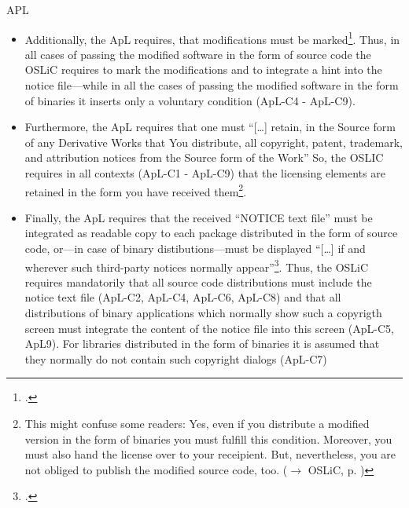 \begin{license}{APL}
\begin{itemize}
  \item Additionally, the ApL requires, that modifications must be
  marked\footcite[cf.][\nopage wp.\ §4.2]{Apl20OsiLicense2004a}. Thus, in all
  cases of passing the modified software in the form of source code the OSLiC
  requires to mark the modifications and to integrate a hint into the notice
  file---while in all the cases of passing the modified software in the form of
  binaries it inserts only a voluntary condition (ApL-C4 - ApL-C9).
  
  \item Furthermore, the ApL requires that one must \enquote{[\ldots] retain, in
  the Source form of any Derivative Works that You distribute, all copyright,
  patent, trademark, and attribution notices from the Source form of the Work}
  So, the OSLIC requires in all contexts (ApL-C1 - ApL-C9) that the licensing
  elements are retained in the form you have received them\footnote{This might
  confuse some readers: Yes, even if you distribute a modified version in the
  form of binaries you must fulfill this condition. Moreover, you must also hand
  the license over to your receipient. But, nevertheless, you are not obliged to
  publish the modified source code, too. ($\rightarrow$ OSLiC, p.
  )}.
  
  \item Finally, the ApL requires that the received ``NOTICE text file'' must be
  integrated as readable copy to each package distributed in the form of source
  code, or---in case of binary distibutions---must be displayed
  \enquote{[\ldots] if and wherever such third-party notices normally
  appear}\footcite[cf.][\nopage wp.\ §4.4]{Apl20OsiLicense2004a}. Thus, the OSLiC
  requires mandatorily that all source code distributions must include the
  notice text file (ApL-C2, ApL-C4, ApL-C6, ApL-C8) and that all distributions of
  binary applications which normally show such a copyrigth screen must integrate
  the content of the notice file into this screen (ApL-C5, ApL9). For libraries
  distributed in the form of binaries it is assumed that they normally do not
  contain such copyright dialogs (ApL-C7)
\end{itemize}

\end{license}

%

